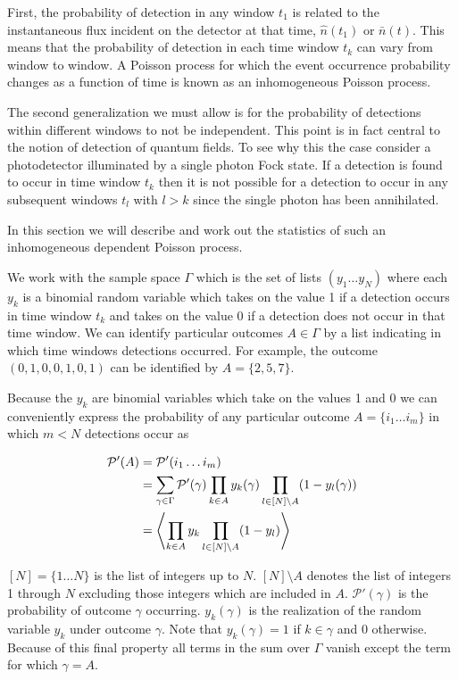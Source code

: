 \documentclass[12pt]{article}
\begin{document}
First, the probability of detection in any window $t_1$ is related to the instantaneous flux incident on the detector at that time, $\hat{n}(t_1)$ or $\bar{n}(t)$. This means that the probability of detection in each time window $t_k$ can vary from window to window. A Poisson process for which the event occurrence probability changes as a function of time is known as an inhomogeneous Poisson process.

The second generalization we must allow is for the probability of detections within different windows to not be independent. This point is in fact central to the notion of detection of quantum fields. To see why this the case consider a photodetector illuminated by a single photon Fock state. If a detection is found to occur in time window $t_k$ then it is not possible for a detection to occur in any subsequent windows $t_l$ with $l>k$ since the single photon has been annihilated.

In this section we will describe and work out the statistics of such an inhomogeneous dependent Poisson process.

We work with the sample space $\Gamma$ which is the set of lists $(y_1 \ldots y_N)$ where each $y_k$ is a binomial random variable which takes on the value 1 if a detection occurs in time window $t_k$ and takes on the value 0 if a detection does not occur in that time window. We can identify particular outcomes $A \in \Gamma$ by a list indicating in which time windows detections occurred. For example, the outcome $(0,1,0,0,1,0,1)$ can be identified by $A = \{2, 5, 7\}$.

Because the $y_k$ are binomial variables which take on the values 1 and 0 we can conveniently express the probability of any particular outcome $A = \{i_1 \ldots i_m \}$ in which $m<N$ detections occur as

\begin{align}
\mathcal{P}'(A) &= \mathcal{P}'(i_1 \ldots i_m)\\
&= \sum_{\gamma \in \Gamma} \mathcal{P}'(\gamma) \prod_{k \in A} y_k(\gamma) \prod_{l \in [N] \setminus A} (1-y_l(\gamma))\\
&=\Braket{\prod_{k \in A} y_k \prod_{l \in [N] \setminus A} (1-y_l)}
\end{align}

$[N] = \{1 \ldots N\}$ is the list of integers up to $N$. $[N]\setminus A$ denotes the list of integers 1 through $N$ excluding those integers which are included in $A$. $\mathcal{P}'(\gamma)$ is the probability of outcome $\gamma$ occurring. $y_k(\gamma)$ is the realization of the random variable $y_k$ under outcome $\gamma$. Note that $y_k(\gamma)=1$ if $k \in \gamma$ and 0 otherwise. Because of this final property all terms in the sum over $\Gamma$ vanish except the term for which $\gamma = A$.
\end{document}
